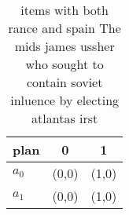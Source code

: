 \documentclass[a4paper]{article}
\begin{document}
\begin{table}
\begin{adjustbox}{width=0.8\columnwidth}
\begin{tabular}{|l|l|l|}
\hline
\textbf{plan} & \multicolumn{1}{c|}{\textbf{0}} & \multicolumn{1}{c|}{\textbf{1}} \\ \hline
\textbf{$a_0$}  & (0,0) & (1,0) \\ \hline
\textbf{$a_1$}  & (0,0) & (1,0) \\ \hline
\end{tabular}
\end{adjustbox}
\caption{ items with both rance and spain The mids james ussher who sought to contain soviet inluence by electing atlantas irst 
}
\end{table}
\end{document}
